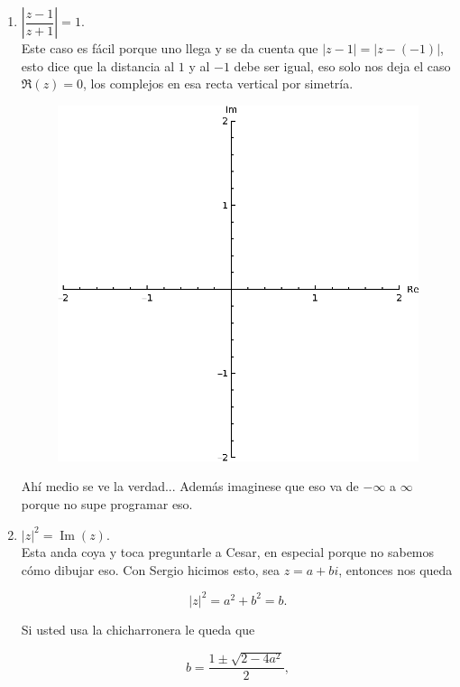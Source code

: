 \documentclass[11pt]{article}
\begin{document}
\begin{enumerate}
\begin{enumerate}
        \item $\left| \dfrac{z - 1}{z + 1} \right| = 1$.\\

        Este caso es fácil porque uno llega y se da cuenta que $|z-1|=|z-(-1)|$, esto dice que la distancia al $1$ y al $-1$ debe ser igual, eso solo nos deja el caso $\Re(z)=0$, los complejos en esa recta vertical por simetría.\\

        \begin{figure}[H]
         \centering
         \includegraphics[scale=0.8]{R5.eps}
         \end{figure}

        Ahí medio se ve la verdad... Además imaginese que eso va de $-\infty$ a $\infty$ porque no supe programar eso.
        \item $|z|^2 = \operatorname{Im}(z)$.\\

        Esta anda  coya y toca  preguntarle a Cesar, en especial porque no sabemos cómo dibujar eso. Con Sergio hicimos esto, sea $z=a+bi$, entonces nos queda

        $$|z|^2 =a^2+b^2=b.$$

        Si usted usa la chicharronera le queda que

        $$ b =\frac{1 \pm \sqrt{2-4 a^2}}{2},$$


\end{enumerate}
\end{enumerate}
\end{document}

